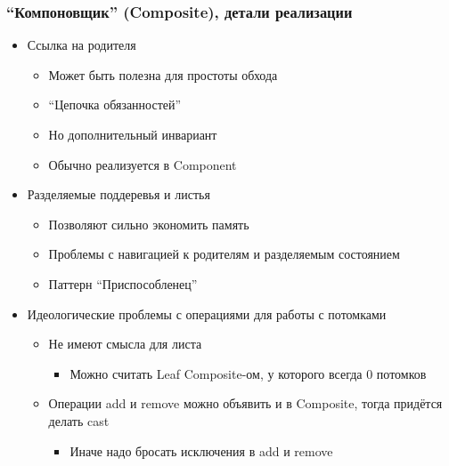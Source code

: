 \documentclass[xetex,mathserif,serif]{beamer}
\begin{document}
    \begin{frame}
        \frametitle{``Компоновщик'' (Composite), детали реализации}
        \begin{itemize}
            \item Ссылка на родителя
            \begin{itemize}
                \item Может быть полезна для простоты обхода
                \item ``Цепочка обязанностей''
                \item Но дополнительный инвариант
                \item Обычно реализуется в Component
            \end{itemize}
            \item Разделяемые поддеревья и листья
            \begin{itemize}
                \item Позволяют сильно экономить память
                \item Проблемы с навигацией к родителям и разделяемым состоянием
                \item Паттерн ``Приспособленец''
            \end{itemize}
            \item Идеологические проблемы с операциями для работы с потомками
            \begin{itemize}
                \item Не имеют смысла для листа
                \begin{itemize}
                    \item Можно считать Leaf Composite-ом, у которого всегда 0 потомков
                \end{itemize}
                \item Операции add и remove можно объявить и в Composite, тогда придётся делать cast
                \begin{itemize}
                    \item Иначе надо бросать исключения в add и remove
                \end{itemize}
            \end{itemize}
        \end{itemize}
    \end{frame}
\end{document}
